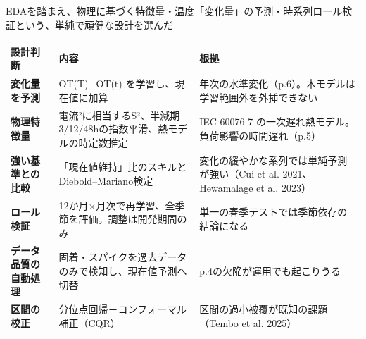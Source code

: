 \documentclass[aspectratio=169,10pt]{beamer}
\begin{document}
\begin{frame}{EDAを踏まえ、物理に基づく特徴量・温度「変化量」の予測・時系列ロール検証という、単純で頑健な設計を選んだ}
  \scriptsize
  \renewcommand{\arraystretch}{1.25}
  \begin{tabularx}{\textwidth}{>{\bfseries}p{3.0cm} X X}
    \toprule
    設計判断 & 内容 & 根拠 \\
    \midrule
    変化量を予測 & OT(T)−OT(t) を学習し、現在値に加算 & 年次の水準変化（p.6）。木モデルは学習範囲外を外挿できない \\
    物理特徴量 & 電流²に相当するS²、半減期3/12/48hの指数平滑、熱モデルの時定数推定 & IEC 60076-7 の一次遅れ熱モデル。負荷影響の時間遅れ（p.5） \\
    強い基準との比較 & 「現在値維持」比のスキルとDiebold–Mariano検定 & 変化の緩やかな系列では単純予測が強い（Cui et al. 2021、Hewamalage et al. 2023） \\
    ロール検証 & 12か月×月次で再学習、全季節を評価。調整は開発期間のみ & 単一の春季テストでは季節依存の結論になる \\
    データ品質の自動処理 & 固着・スパイクを過去データのみで検知し、現在値予測へ切替 & p.4の欠陥が運用でも起こりうる \\
    区間の校正 & 分位点回帰＋コンフォーマル補正（CQR） & 区間の過小被覆が既知の課題（Tembo et al. 2025） \\
    \bottomrule
  \end{tabularx}
\end{frame}
\end{document}
